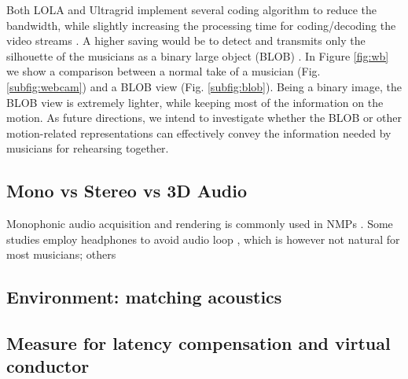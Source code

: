 Both LOLA and Ultragrid implement several coding algorithm to reduce the bandwidth, while slightly increasing the processing time for coding/decoding the video streams \cite{drioli2013networked,holub2006high}. A higher saving would be to detect and transmits only the silhouette of the musicians as a binary large object (BLOB) \cite{camurri2010visual}. In Figure \ref{fig:wb} we show a comparison between a normal take of a musician (Fig. \ref{subfig:webcam}) and a BLOB view (Fig. \ref{subfig:blob}).
Being a binary image, the BLOB view is extremely lighter, while keeping most of the information on the motion. As future directions, we intend to investigate whether the BLOB or other motion-related representations can effectively convey the information needed by musicians for rehearsing together. 


\subsection{Mono vs Stereo vs 3D Audio}
Monophonic audio acquisition and rendering is commonly used in NMPs \cite{CIM2018}. Some studies employ headphones to avoid audio loop \cite{RottondiFeature}, which is however not natural for most musicians; others 

\subsection{Environment: matching acoustics}

\subsection{Measure for latency compensation and virtual conductor}

